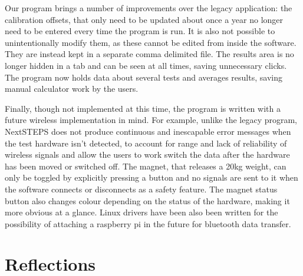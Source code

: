 \documentclass{l3proj}
\begin{document}
Our program brings a number of improvements over the legacy application: the calibration offsets, that only need to be updated about once a year no longer need to be entered every time the program is run. It is also not possible to unintentionally modify them, as these cannot be edited from inside the software. They are instead kept in a separate comma delimited file. The results area is no longer hidden in a tab and can be seen at all times, saving unnecessary clicks. The program now holds data about several tests and averages results, saving manual calculator work by the users.

Finally, though not implemented at this time, the program is written with a future wireless implementation in mind. For example, unlike the legacy program, NextSTEPS does not produce continuous and inescapable error messages when the test hardware isn't detected, to account for range and lack of reliability of wireless signals and allow the users to work switch the data after the hardware has been moved or switched off. The magnet, that releases a 20kg weight, can only be toggled by explicitly pressing a button and no signals are sent to it when the software connects or disconnects as a safety feature. The magnet status button also changes colour depending on the status of the hardware, making it more obvious at a glance. Linux drivers have been also been written for the possibility of attaching a raspberry pi in the future for bluetooth data transfer. 
\section{Reflections}
\end{document}
